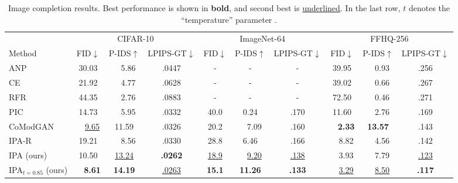 \begin{table}
  \small
  \caption{Image completion results. Best performance is shown in \textbf{bold},
    and second best is \underline{underlined}. In the last row, $t$ denotes the
    ``temperature'' parameter \citep{child2020very}.}
  \label{tab:results-completion}
  \centering
  \begin{tabular}{lccccccccc}
    \toprule
    \multicolumn{1}{r}{} & \multicolumn{3}{c}{CIFAR-10}  & \multicolumn{3}{c}{ImageNet-64}  & \multicolumn{3}{c}{FFHQ-256} \\
    \cmidrule(r){2-4} \cmidrule(r){5-7} \cmidrule(r){8-10} %
    Method        & \quad FID$\downarrow$ \quad     & P-IDS$\uparrow$  & LPIPS-GT$\downarrow$ & \quad FID$\downarrow$ \quad    & P-IDS$\uparrow$  & LPIPS-GT$\downarrow$& \quad FID$\downarrow$ \quad    & P-IDS$\uparrow$  & LPIPS-GT$\downarrow$ \\
    \midrule
    ANP                        & 30.03               & ~~5.86              & .0447                         & -                 & -                 & -                & 39.95              & ~~0.93              & .256 \\
    CE                         & 21.92               & ~~4.77              & .0628                         & -                 & -                 & -                & 39.02              & ~~0.66              & .267 \\
    RFR                        & 44.35               & ~~2.76              & .0883                         & -                 & -                   & -              & 72.50              & ~~0.46              & .271 \\
    PIC                        & 14.73               & ~~5.95              & .0332                         & 40.0              & 0.24                & .170           & 11.60              & ~~2.76              & .169 \\
    CoModGAN                   & ~~\underline{9.65}  & 11.59               & .0326                         & 20.2              & ~~7.09              & .160           & ~~\textbf{2.33}    & \textbf{13.57}      & .143 \\
    IPA-R                      & 19.21               & ~~8.56              & .0330                         & 28.8              & 6.46                & .166           & ~~8.82             & ~~4.56              & .142 \\
    IPA (ours)                 & 10.50               & \underline{13.24}   & \textbf{.0262}                & \underline{18.9}  & ~~\underline{9.20}  & \underline{.138}  & ~~3.93             & ~~7.79              & \underline{.123} \\
    IPA$_{t=0.85}$ (ours)      & ~~\textbf{8.61}     & \textbf{14.19}      & \underline{.0263}             & \textbf{15.1}     & \textbf{11.26}    & \textbf{.133}     & ~~\underline{3.29} & ~~\underline{8.50}  & \textbf{.117} \\
    \bottomrule
  \end{tabular}
  \vspace{-1em}
\end{table}


